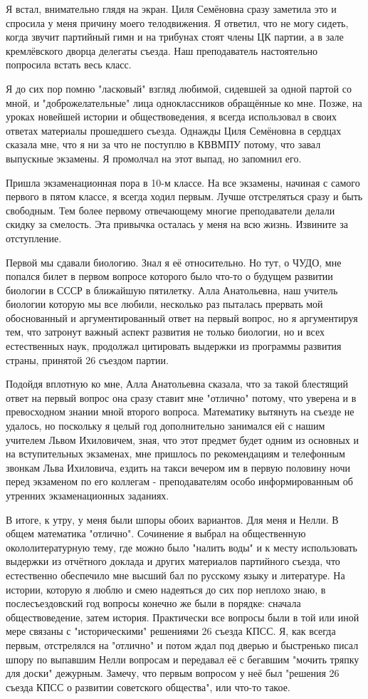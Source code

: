 Я встал, внимательно глядя на экран. Циля Семёновна сразу заметила это и
спросила у меня причину моего телодвижения. Я ответил, что не могу сидеть,
когда звучит партийный гимн и на трибунах стоят члены ЦК партии, а в зале
кремлёвского дворца делегаты съезда. Наш преподаватель настоятельно попросила
встать весь класс. 

Я до сих пор помню "ласковый" взгляд любимой, сидевшей за одной партой со мной,
и "доброжелательные" лица одноклассников обращённые ко мне. Позже, на уроках
новейшей истории и обществоведения, я всегда использовал в своих ответах
материалы прошедшего съезда. Однажды Циля Семёновна в сердцах сказала мне, что
я ни за что не поступлю в КВВМПУ потому, что завал выпускные экзамены. Я
промолчал на этот выпад, но запомнил его. 

Пришла экзаменационная пора в 10-м классе. На все экзамены, начиная с самого
первого в пятом классе, я всегда ходил первым. Лучше отстреляться сразу и быть
свободным. Тем более первому отвечающему многие преподаватели делали скидку за
смелость. Эта привычка осталась у меня на всю жизнь. Извините за отступление. 

Первой мы сдавали биологию. Знал я её относительно. Но тут, о ЧУДО, мне попался
билет в первом вопросе которого было что-то о будущем развитии биологии в СССР
в ближайшую пятилетку. Алла Анатольевна, наш учитель биологии которую мы все
любили, несколько раз пыталась прервать мой обоснованный и аргументированный
ответ на первый вопрос, но я аргументируя тем, что затронут важный аспект
развития не только биологии, но и всех естественных наук, продолжал цитировать
выдержки из программы развития страны, принятой 26 съездом партии.

Подойдя вплотную ко мне, Алла Анатольевна сказала, что за такой блестящий
ответ на первый вопрос она сразу ставит мне "отлично" потому, что уверена и в
превосходном знании мной второго вопроса. Математику вытянуть на съезде не
удалось, но поскольку я целый год дополнительно занимался ей с нашим учителем
Львом Ихиловичем, зная, что этот предмет будет одним из основных и на
вступительных экзаменах, мне пришлось по рекомендациям и телефонным звонкам
Льва Ихиловича, ездить на такси вечером им в первую половину ночи перед
экзаменом по его коллегам - преподавателям особо информированным об утренних
экзаменационных заданиях. 

В итоге, к утру, у меня были шпоры обоих вариантов.
Для меня и Нелли. В общем математика "отлично". Сочинение я выбрал на
общественную окололитературную тему, где можно было "налить воды" и к месту
использовать выдержки из отчётного доклада и других материалов партийного
съезда, что естественно обеспечило мне высший бал по русскому языку и
литературе. На истории, которую я люблю и смею надеяться до сих пор неплохо
знаю, в послесъездовский год вопросы конечно же были в порядке: сначала
обществоведение, затем история. Практически все вопросы были в той или иной
мере связаны с "историческими" решениями 26 съезда КПСС. Я, как всегда
первым, отстрелялся на "отлично" и потом ждал под дверью и быстренько писал
шпору по выпавшим Нелли вопросам и передавал её с бегавшим "мочить тряпку для
доски" дежурным. Замечу, что первым вопросом у неё был "решения 26 съезда
КПСС о развитии советского общества", или что-то такое. 

